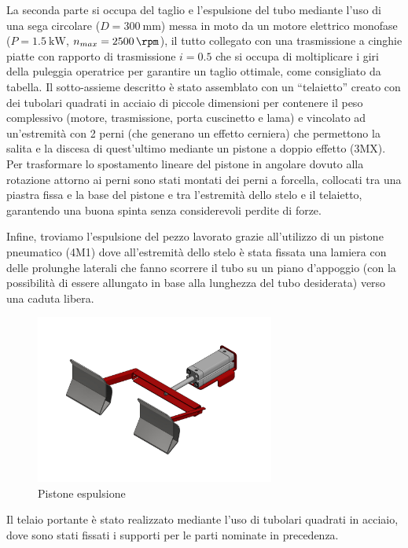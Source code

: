 \documentclass{report}
\begin{document}
La seconda parte si occupa del taglio e l’espulsione del tubo mediante l’uso di una sega circolare ($D=\SI{300}{\mm}$) messa in moto da un motore elettrico monofase ($P = \SI{1,5}{\kW}$, $n_{max}=\SI{2500}{\rpm}$), il tutto collegato con una trasmissione a cinghie piatte con rapporto di trasmissione $i=\num{0.5}$ che si occupa di moltiplicare i giri della puleggia operatrice per garantire un taglio ottimale, come consigliato da tabella. Il sotto-assieme descritto è stato assemblato con un “telaietto” creato con dei tubolari quadrati in acciaio di piccole dimensioni per contenere il peso complessivo (motore, trasmissione, porta cuscinetto e lama) e vincolato ad un’estremità con 2 perni (che generano un effetto cerniera) che permettono la salita e la discesa di quest’ultimo mediante un pistone a doppio effetto (3MX). Per trasformare lo spostamento lineare del pistone in angolare dovuto alla rotazione attorno ai perni sono stati montati dei perni a forcella, collocati tra una piastra fissa e la base del pistone e tra l’estremità dello stelo e il telaietto, garantendo una buona spinta senza considerevoli perdite di forze. 

Infine, troviamo l’espulsione del pezzo lavorato grazie all’utilizzo di un pistone pneumatico (4M1) dove all’estremità dello stelo è stata fissata una lamiera con delle prolunghe laterali che fanno scorrere il tubo su un piano d’appoggio (con la possibilità di essere allungato in base alla lunghezza del tubo desiderata) verso una caduta libera.
\begin{figure}[H]
  \centering
  \includegraphics[width=0.7\textwidth]{src/img/espulsione.pdf}
  \caption{Pistone espulsione}
  \label{fig:espulsione}
\end{figure}
Il telaio portante è stato realizzato mediante l’uso di tubolari quadrati in acciaio, dove sono stati fissati i supporti per le parti nominate in precedenza.
\end{document}

